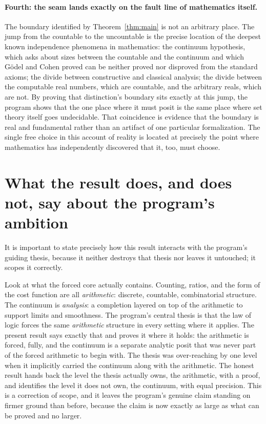 \documentclass[11pt,a4paper]{article}
\theoremstyle{definition}
\theoremstyle{remark}
\begin{document}
\paragraph{Fourth: the seam lands exactly on the fault line of mathematics
itself.} The boundary identified by Theorem~\ref{thm:main} is not an arbitrary
place. The jump from the countable to the uncountable is the precise location of
the deepest known independence phenomena in mathematics: the continuum
hypothesis, which asks about sizes between the countable and the continuum and
which G\"odel and Cohen proved can be neither proved nor disproved from the
standard axioms; the divide between constructive and classical analysis; the
divide between the computable real numbers, which are countable, and the
arbitrary reals, which are not. By proving that distinction's boundary sits
exactly at this jump, the program shows that the one place where it must posit is
the same place where set theory itself goes undecidable. That coincidence is
evidence that the boundary is real and fundamental rather than an artifact of one
particular formalization. The single free choice in this account of reality is
located at precisely the point where mathematics has independently discovered
that it, too, must choose.

\section{What the result does, and does not, say about the program's ambition}

It is important to state precisely how this result interacts with the program's
guiding thesis, because it neither destroys that thesis nor leaves it untouched;
it scopes it correctly.

Look at what the forced core actually contains. Counting, ratios, and the form of
the cost function are all \emph{arithmetic}: discrete, countable, combinatorial
structure. The continuum is \emph{analysis}: a completion layered on top of the
arithmetic to support limits and smoothness. The program's central thesis is that
the law of logic forces the same \emph{arithmetic} structure in every setting
where it applies. The present result says exactly that and proves it where it
holds: the arithmetic is forced, fully, and the continuum is a separate analytic
posit that was never part of the forced arithmetic to begin with. The thesis was
over-reaching by one level when it implicitly carried the continuum along with the
arithmetic. The honest result hands back the level the thesis actually owns, the
arithmetic, with a proof, and identifies the level it does not own, the continuum,
with equal precision. This is a correction of scope, and it leaves the program's
genuine claim standing on firmer ground than before, because the claim is now
exactly as large as what can be proved and no larger.
\end{document}
